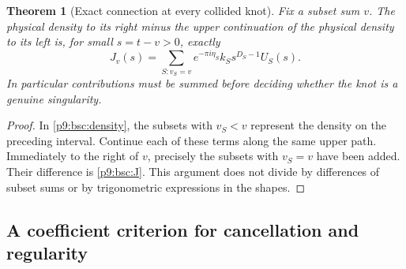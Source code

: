 \documentclass[11pt,a4paper]{article}
\newtheorem{theorem}{Theorem}[section]
\theoremstyle{definition}
\theoremstyle{remark}
\numberwithin{equation}{section}
\begin{document}
\begin{theorem}[Exact connection at every collided knot]\label{p9:bsc:jump}
Fix a subset sum $v$. The physical density to its right minus the
upper continuation of the physical density to its left is, for
small $s=t-v>0$, exactly
\begin{equation}\label{p9:bsc:J}
 J_v(s)=\sum_{S:v_S=v} e^{-\pi i\eta_S}k_Ss^{D_S-1}U_S(s).
\end{equation}
In particular contributions must be summed before deciding whether
the knot is a genuine singularity.
\end{theorem}
\begin{proof}
In \eqref{p9:bsc:density}, the subsets with $v_S<v$ represent the density
on the preceding interval. Continue each of these terms along the
same upper path. Immediately to the right of $v$, precisely the
subsets with $v_S=v$ have been added. Their difference is
\eqref{p9:bsc:J}. This argument does not divide by differences of
subset sums or by trigonometric expressions in the shapes.
\end{proof}

\subsection{A coefficient criterion for cancellation and regularity}
\end{document}
